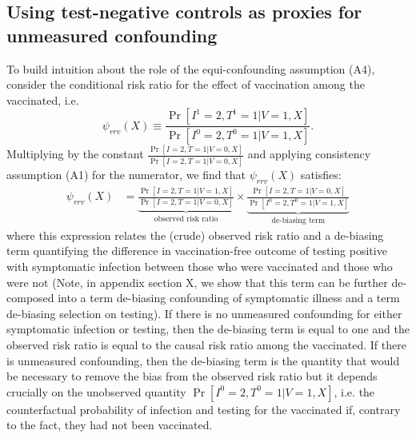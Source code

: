 \documentclass[11pt]{article}
\begin{document}
\subsection{Using test-negative controls as proxies for unmeasured confounding} \label{sec:effect_among_vaccinated}
To build intuition about the role of the equi-confounding assumption (A4), consider the conditional risk ratio for the effect of vaccination among the vaccinated, i.e.
\begin{equation*}
    \psi_{rrv}(X) \equiv \frac{\Pr[I^1 = 2, T^1 = 1 | V = 1, X]}{\Pr[I^0 = 2, T^0 = 1 | V = 1, X]}.
\end{equation*}
Multiplying by the constant $\frac{\Pr[I = 2, T = 1 | V = 0, X]}{\Pr[I = 2, T = 1 | V = 0, X]}$ and applying consistency assumption (A1) for the numerator, we find that $\psi_{rrv}(X)$ satisfies:
\begin{align*}
    \psi_{rrv}(X) &=\underbrace{\frac{\Pr[I = 2, T = 1 | V = 1, X]}{\Pr[I = 2, T = 1 | V = 0, X]}}_{\text{observed risk ratio}} \times \underbrace{\frac{\Pr[I = 2, T = 1 | V = 0, X]}{\Pr[I^0 = 2, T^0 = 1 | V = 1, X]}}_{\text{de-biasing term}} 
\end{align*}
where this expression relates the (crude) observed risk ratio and a de-biasing term quantifying the difference in vaccination-free outcome of testing positive with symptomatic infection between those who were vaccinated and those who were not (Note, in appendix section X, we show that this term can be further de-composed into a term de-biasing confounding of symptomatic illness and a term de-biasing selection on testing). If there is no unmeasured confounding for either symptomatic infection or testing, then the de-biasing term is equal to one and the observed risk ratio is equal to the causal risk ratio among the vaccinated. If there is unmeasured confounding, then the de-biasing term is the quantity that would be necessary to remove the bias from the observed risk ratio but it depends crucially on the unobserved quantity $\Pr[I^0 = 2, T^0 = 1 | V = 1, X]$, i.e. the counterfactual probability of infection and testing for the vaccinated if, contrary to the fact, they had not been vaccinated. 
\end{document}

